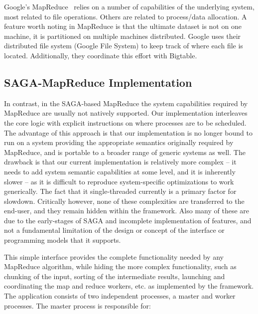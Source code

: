 \documentclass[conference,final]{IEEEtran}
\newcommand{\jhanote}[1]{ {\textcolor{red} { ***SJ: #1 }}}
\newcommand{\jhanote}[1]{}
\newcommand{\sagamapreduce }{SAGA-MapReduce }
\begin{document}
Google's MapReduce~\cite{mapreduce-paper} relies on a number of
capabilities of the underlying system, most related to file
operations.  Others are related to process/data allocation.  A feature
worth noting in MapReduce is that the ultimate dataset is not on one
machine, it is partitioned on multiple machines distributed. Google
uses their distributed file system (Google File System) to keep track
of where each file is located.  Additionally, they coordinate this
effort with Bigtable.  

\subsection{\sagamapreduce Implementation} In contrast, in the
SAGA-based MapReduce the system capabilities required by MapReduce are
usually not natively supported. Our implementation interleaves the
core logic with explicit instructions on where processes are to be
scheduled.  The advantage of this approach is that our implementation
is no longer bound to run on a system providing the appropriate
semantics originally required by MapReduce, and is portable to a
broader range of generic systems as well.  The drawback is that our
current implementation is relatively more complex -- it needs to add
system semantic capabilities at some level, and it is inherently
slower -- as it is difficult to reproduce system-specific
optimizations to work generically. The fact that it single-threaded
currently is a primary factor for slowdown.  Critically however, none
of these complexities are transferred to the end-user, and they remain
hidden within the framework. Also many of these are due to the
early-stages of SAGA and incomplete implementation of features, and
not a fundamental limitation of the design or concept of the interface
or programming models that it supports.

This simple interface provides the complete functionality needed by
any MapReduce algorithm, while hiding the more complex functionality,
such as chunking of the input, sorting of the intermediate results,
launching and coordinating the map and reduce workers, etc. as
implemented by the framework.  The application consists of two
independent processes, a master and worker processes. The master
process is responsible for:

\end{document}
